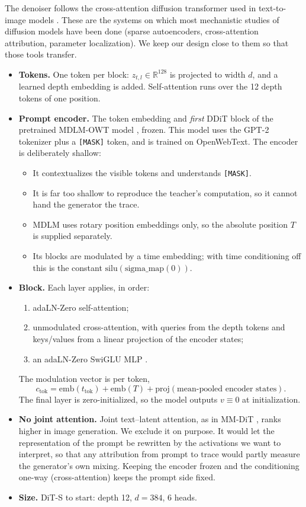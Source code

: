 \documentclass[11pt]{article}
\newcommand{\R}{\mathbb{R}}
\newcommand{\MASK}{\texttt{[MASK]}}
\begin{document}
The denoiser follows the cross-attention diffusion transformer used in text-to-image models
\citep{peebles2023dit,chen2024pixart}. These are the systems on which most mechanistic studies of diffusion models have
been done (sparse autoencoders, cross-attention attribution, parameter localization). We keep our design close to them so
that those tools transfer.
\begin{itemize}[leftmargin=1.5em]
  \item \textbf{Tokens.} One token per block: $z_{t,l} \in \R^{128}$ is projected to width $d$, and a learned depth embedding
    is added. Self-attention runs over the 12 depth tokens of one position.
  \item \textbf{Prompt encoder.} The token embedding and \emph{first} DDiT block of the pretrained MDLM-OWT model
    \citep{sahoo2024mdlm}, frozen. This model uses the GPT-2 tokenizer plus a \MASK{} token, and is trained on OpenWebText.
    The encoder is deliberately shallow:
    \begin{itemize}[leftmargin=1.2em]
      \item It contextualizes the visible tokens and understands \MASK{}.
      \item It is far too shallow to reproduce the teacher's computation, so it cannot hand the generator the trace.
      \item MDLM uses rotary position embeddings only, so the absolute position $T$ is supplied separately.
      \item Its blocks are modulated by a time embedding; with time conditioning off this is the constant
        $\mathrm{silu}(\text{sigma\_map}(0))$.
    \end{itemize}
  \item \textbf{Block.} Each layer applies, in order:
    \begin{enumerate}[leftmargin=1.2em]
      \item adaLN-Zero self-attention;
      \item unmodulated cross-attention, with queries from the depth tokens and keys/values from a linear projection of the
        encoder states;
      \item an adaLN-Zero SwiGLU MLP \citep{shazeer2020glu}.
    \end{enumerate}
    The modulation vector is per token,
    \[ c_{\text{tok}} = \text{emb}(t_{\text{tok}}) + \text{emb}(T) + \text{proj}(\text{mean-pooled encoder states}). \]
    The final layer is zero-initialized, so the model outputs $v \equiv 0$ at initialization.
  \item \textbf{No joint attention.} Joint text--latent attention, as in MM-DiT \citep{esser2024sd3}, ranks higher in image
    generation. We exclude it on purpose. It would let the representation of the prompt be rewritten by the activations we
    want to interpret, so that any attribution from prompt to trace would partly measure the generator's own mixing.
    Keeping the encoder frozen and the conditioning one-way (cross-attention) keeps the prompt side fixed.
  \item \textbf{Size.} DiT-S to start: depth 12, $d = 384$, 6 heads.
\end{itemize}
\end{document}
